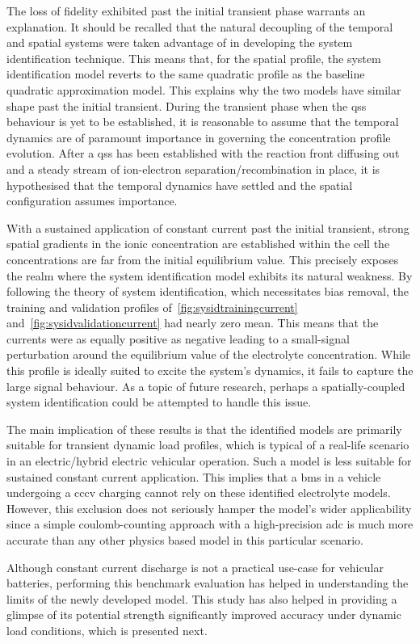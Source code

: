The  loss  of fidelity  exhibited  past  the  initial transient  phase  warrants
an  explanation. It  should  be  recalled that  the  natural  decoupling of  the
temporal and  spatial systems were taken  advantage of in developing  the system
identification technique. This  means that, for the spatial  profile, the system
identification  model reverts  to the  same  quadratic profile  as the  baseline
quadratic approximation  model. This  explains why the  two models  have similar
shape past the initial transient. During  the transient phase when the \gls{qss}
behaviour is yet to be established, it is reasonable to assume that the temporal
dynamics  are of  paramount importance  in governing  the concentration  profile
evolution.  After a  \gls{qss}  has  been established  with  the reaction  front
diffusing out  and a steady  stream of ion-electron  separation/recombination in
place,  it is  hypothesised  that the  temporal dynamics  have  settled and  the
spatial configuration assumes importance.

With a  sustained application  of constant current  past the  initial transient,
strong spatial gradients  in the ionic concentration are  established within the
cell \ie{} the  concentrations are far from the initial  equilibrium value. This
precisely  exposes the  realm  where the  system  identification model  exhibits
its  natural  weakness.  By  following  the  theory  of  system  identification,
which  necessitates   bias  removal,   the  training  and   validation  profiles
of~\cref{fig:sysidtrainingcurrent}   and~\cref{fig:sysidvalidationcurrent}   had
nearly  zero mean.  This means  that the  currents were  as equally  positive as
negative leading to a small-signal  perturbation around the equilibrium value of
the electrolyte  concentration. While this  profile is ideally suited  to excite
the system's  dynamics, it  fails to  capture the large  signal behaviour.  As a
topic  of future  research,  perhaps a  spatially-coupled system  identification
could be attempted to handle this issue.

The  main  implication of  these  results  is  that  the identified  models  are
primarily suitable for  transient \ie{} dynamic load profiles,  which is typical
of a real-life scenario in an electric/hybrid electric vehicular operation. Such
a  model is  less  suitable  for sustained  constant  current application.  This
implies that  a \gls{bms} in a  vehicle undergoing a \gls{cccv}  charging cannot
rely on  these identified electrolyte  models. However, this exclusion  does not
seriously hamper the model's wider applicability since a simple coulomb-counting
approach with  a high-precision \gls{adc} is  much more accurate than  any other
physics based model in this particular scenario.

Although constant  current discharge is  not a practical use-case  for vehicular
batteries, performing this benchmark evaluation  has helped in understanding the
limits of the newly  developed model. This study has also  helped in providing a
glimpse of its  potential strength \viz{} significantly  improved accuracy under
dynamic load conditions, which is presented next.

